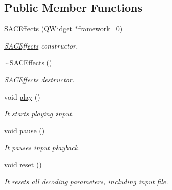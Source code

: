 \subsection*{Public Member Functions}
\begin{DoxyCompactItemize}
\item 
\hyperlink{class_s_a_c_effects_aad64fe6a36a53d1ffeae59bccbd8af33}{S\+A\+C\+Effects} (Q\+Widget $\ast$framework=0)
\begin{DoxyCompactList}\small\item\em \hyperlink{class_s_a_c_effects}{S\+A\+C\+Effects} constructor. \end{DoxyCompactList}\item 
\mbox{\label{class_s_a_c_effects_a623a31e247ad7e94b2c14a640d8e3440}} 
\hyperlink{class_s_a_c_effects_a623a31e247ad7e94b2c14a640d8e3440}{$\sim$\+S\+A\+C\+Effects} ()
\begin{DoxyCompactList}\small\item\em \hyperlink{class_s_a_c_effects}{S\+A\+C\+Effects} destructor. \end{DoxyCompactList}\item 
\mbox{\label{class_s_a_c_effects_a951a42151be007375d03ccd9a1e2ad5b}} 
void \hyperlink{class_s_a_c_effects_a951a42151be007375d03ccd9a1e2ad5b}{play} ()
\begin{DoxyCompactList}\small\item\em It starts playing input. \end{DoxyCompactList}\item 
\mbox{\label{class_s_a_c_effects_af9b8e4d685e5c0b687a3f8a17a70133d}} 
void \hyperlink{class_s_a_c_effects_af9b8e4d685e5c0b687a3f8a17a70133d}{pause} ()
\begin{DoxyCompactList}\small\item\em It pauses input playback. \end{DoxyCompactList}\item 
\mbox{\label{class_s_a_c_effects_a4500b30a621d5eff4a108f1f8d0d59a3}} 
void \hyperlink{class_s_a_c_effects_a4500b30a621d5eff4a108f1f8d0d59a3}{reset} ()
\begin{DoxyCompactList}\small\item\em It resets all decoding parameters, including input file. \end{DoxyCompactList}\item 

\end{DoxyCompactItemize}
